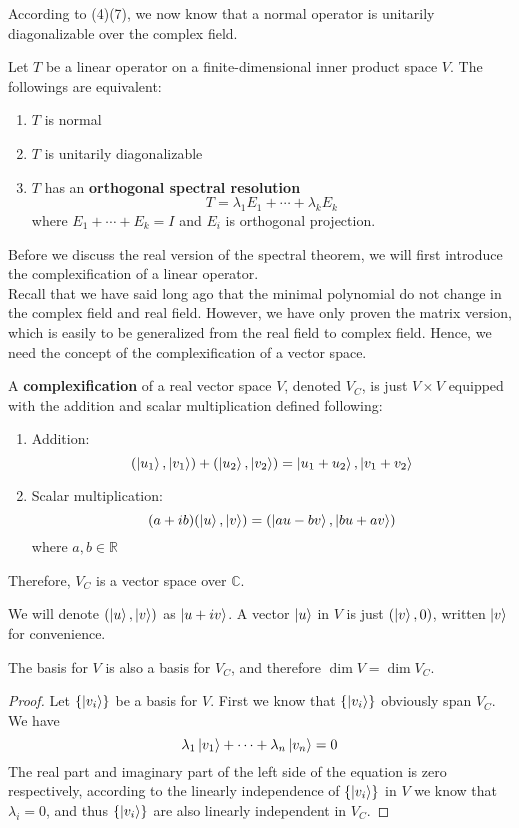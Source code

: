 \documentclass{article}
\begin{document}
According to (4)(7), we now know that a normal operator is unitarily diagonalizable over the complex field.
\begin{thm}
	Let $T$ be a linear operator on a finite-dimensional inner product space $V$. The followings are equivalent:
	\begin{enumerate}
		\item $T$ is normal
		\item $T$ is unitarily diagonalizable
		\item $T$ has an \textbf{orthogonal spectral resolution}
		\[T=\lambda_1E_1+\cdots+\lambda_kE_k\]
		where $E_1+\cdots+E_k=I$ and $E_i$ is orthogonal projection.
	\end{enumerate}
\end{thm}
Before we discuss the real version of the spectral theorem, we will first introduce the complexification of a linear operator.\\
\indent Recall that we have said long ago that the minimal polynomial do not change in the complex field and real field. However, we have only proven the matrix version, which is easily to be generalized from the real field to complex field. Hence, we need the concept of the complexification of a vector space.\\
\begin{dde}
	A \textbf{complexification} of a real vector space $V$, denoted $V_C$, is just $V\times V$ equipped with the addition and scalar multiplication defined following:
	\begin{enumerate}
		\item Addition:
		\[(\ket{u_1},\ket{v_1})+(\ket{u_2},\ket{v_2})=\ket{u_1+u_2},\ket{v_1+v_2}\]
		\item Scalar multiplication:
		\[(a+ib)(\ket{u},\ket{v})=(\ket{au-bv},\ket{bu+av})\]
		where $a,b\in \mathbb{R}$
	\end{enumerate}
	Therefore, $V_C$ is a vector space over $\mathbb{C}$.
\end{dde}
We will denote $(\ket{u},\ket{v})$ as $\ket{u+iv}$. A vector $\ket{u}$ in $V$ is just $(\ket{v},0)$, written $\ket{v}$ for convenience.
\begin{thm}
	The basis for $V$ is also a basis for $V_C$, and therefore $\dim V=\dim V_C$.
\end{thm}
\begin{proof}
	Let $\{\ket{v_i}\}$ be a basis for $V$. First we know that $\{\ket{v_i}\}$ obviously span $V_C$. We have
	\[\lambda_1\ket{v_1}+\cdots+\lambda_n\ket{v_n}=0\]
	The real part and imaginary part of the left side of the equation is zero respectively, according to the linearly independence of $\{\ket{v_i}\}$ in $V$ we know that $\lambda_i=0$, and thus $\{\ket{v_i}\}$ are also linearly independent in $V_C$.
\end{proof}
\end{document}
